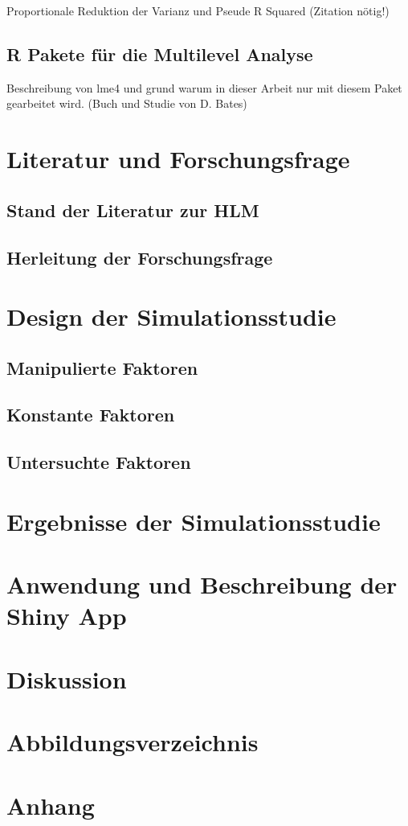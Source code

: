 \documentclass[12pt]{article}\usepackage[]{graphicx}\usepackage[]{color}
\begin{document}
Proportionale Reduktion der Varianz und Pseude R Squared (Zitation nötig!)

\subsection{R Pakete für die Multilevel Analyse}
Beschreibung von lme4 und grund warum in dieser Arbeit nur mit diesem Paket gearbeitet wird. (Buch und Studie von D. Bates)

\section{Literatur und Forschungsfrage}
\subsection{Stand der Literatur zur HLM}
\subsection{Herleitung der Forschungsfrage}

\section{Design der Simulationsstudie}
\subsection{Manipulierte Faktoren}
\subsection{Konstante Faktoren}
\subsection{Untersuchte Faktoren}

\section{Ergebnisse der Simulationsstudie}
\section{Anwendung und Beschreibung der Shiny App}
\section{Diskussion}
\newpage



\section{Abbildungsverzeichnis}
\section{Anhang}
\end{document}
